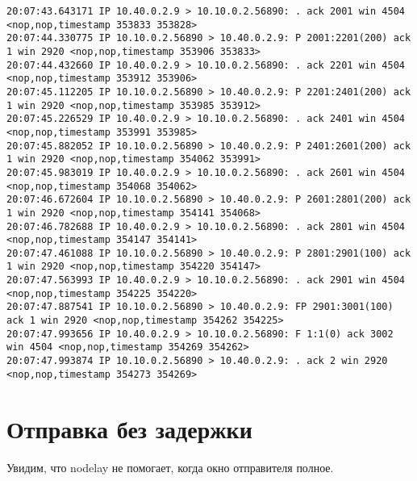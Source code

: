 \documentclass[a4paper,12pt]{article}
\begin{document}
\begin{lstlisting}
20:07:43.643171 IP 10.40.0.2.9 > 10.10.0.2.56890: . ack 2001 win 4504 <nop,nop,timestamp 353833 353828>
20:07:44.330775 IP 10.10.0.2.56890 > 10.40.0.2.9: P 2001:2201(200) ack 1 win 2920 <nop,nop,timestamp 353906 353833>
20:07:44.432660 IP 10.40.0.2.9 > 10.10.0.2.56890: . ack 2201 win 4504 <nop,nop,timestamp 353912 353906>
20:07:45.112205 IP 10.10.0.2.56890 > 10.40.0.2.9: P 2201:2401(200) ack 1 win 2920 <nop,nop,timestamp 353985 353912>
20:07:45.226529 IP 10.40.0.2.9 > 10.10.0.2.56890: . ack 2401 win 4504 <nop,nop,timestamp 353991 353985>
20:07:45.882052 IP 10.10.0.2.56890 > 10.40.0.2.9: P 2401:2601(200) ack 1 win 2920 <nop,nop,timestamp 354062 353991>
20:07:45.983019 IP 10.40.0.2.9 > 10.10.0.2.56890: . ack 2601 win 4504 <nop,nop,timestamp 354068 354062>
20:07:46.672604 IP 10.10.0.2.56890 > 10.40.0.2.9: P 2601:2801(200) ack 1 win 2920 <nop,nop,timestamp 354141 354068>
20:07:46.782688 IP 10.40.0.2.9 > 10.10.0.2.56890: . ack 2801 win 4504 <nop,nop,timestamp 354147 354141>
20:07:47.461088 IP 10.10.0.2.56890 > 10.40.0.2.9: P 2801:2901(100) ack 1 win 2920 <nop,nop,timestamp 354220 354147>
20:07:47.563993 IP 10.40.0.2.9 > 10.10.0.2.56890: . ack 2901 win 4504 <nop,nop,timestamp 354225 354220>
20:07:47.887541 IP 10.10.0.2.56890 > 10.40.0.2.9: FP 2901:3001(100) ack 1 win 2920 <nop,nop,timestamp 354262 354225>
20:07:47.993656 IP 10.40.0.2.9 > 10.10.0.2.56890: F 1:1(0) ack 3002 win 4504 <nop,nop,timestamp 354269 354262>
20:07:47.993874 IP 10.10.0.2.56890 > 10.40.0.2.9: . ack 2 win 2920 <nop,nop,timestamp 354273 354269>
\end{lstlisting}

\section{Отправка без задержки}
Увидим, что nodelay не помогает, когда окно отправителя полное.
\end{document}
